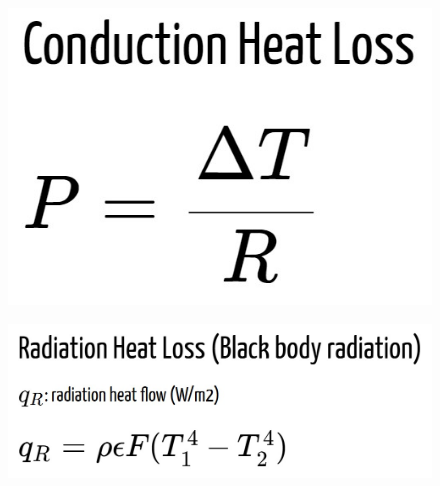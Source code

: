 \documentclass[twocolumn, ]{article}
\begin{document}
\begin{figure}
	\includegraphics[scale=0.65]{conduction.jpg}
\end{figure}

\begin{figure}
	\includegraphics[scale=0.65]{Radiation.jpg}
\end{figure}
\end{document}
